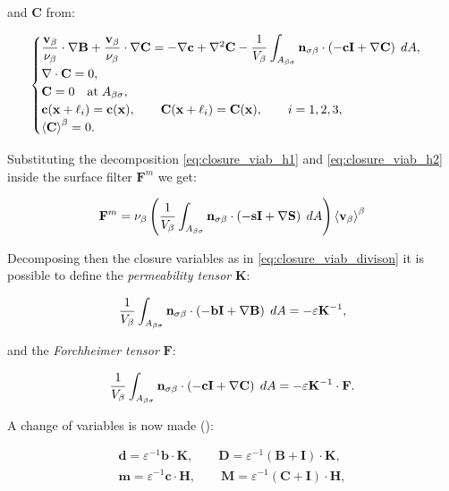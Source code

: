 \newpage
and $\mathbf{C}$ from:

\begin{eqnarray}
	\begin{cases}
		\dfrac{\textbf{v}_{\beta}}{\nu_{\beta}} \cdot  \nabla \mathbf{B} +\dfrac{\textbf{v}_{\beta}}{\nu_{\beta}} \cdot  \nabla \mathbf{C} = -\nabla \mathbf{c} +  \nabla^2 \mathbf{C} - \dfrac{1}{V_\beta} \displaystyle \int_{A_{\beta \sigma}}  \mathbf{n}_{\sigma \beta}  \cdot \left(-\mathbf{c}\mathbf{I}  +  \nabla \mathbf{C} \right)  \;dA,  \\
		\nabla \cdot \mathbf{C} = 0, \\
		\mathbf{C} = 0 \quad \textrm{at} \; A_{\beta \sigma}, \\
		\mathbf{c}(\mathbf{x} +\ell_i) = \mathbf{c}(\mathbf{x}), \qquad \mathbf{C}(\mathbf{x} +\ell_i) = \mathbf{C}(\mathbf{x}), \qquad i=1,2,3 ,\\
		{\left< \mathbf{C} \right>}^{\beta} = 0.
	\end{cases}
\label{eq:C_problem}
\end{eqnarray}

\noindent Substituting the decomposition \eqref{eq:closure_viab_h1} and \eqref{eq:closure_viab_h2} inside the surface filter $\mathbf{F}^m$ we get:

$$
\mathbf{F}^m = \nu_{\beta} \left(\dfrac{1}{V_\beta} \int_{A_{\beta \sigma}} \mathbf{n}_{\sigma \beta}  \cdot \left(-\mathbf{s}\mathbf{I}  +  \nabla \mathbf{S} \right) \;dA \right) {\left< \textbf{v}_{\beta} \right>}^{\beta}
$$

\noindent Decomposing then the closure variables as in \eqref{eq:closure_viab_divison} it is possible to define the \textit{permeability tensor} $\mathbf{K}$:

$$
 \dfrac{1}{V_\beta} \int_{A_{\beta \sigma}} \mathbf{n}_{\sigma \beta}  \cdot \left(-\mathbf{b}\mathbf{I}  +  \nabla \mathbf{B} \right) \;dA = -\varepsilon \mathbf{K}^{-1},
$$

\noindent and the \textit{Forchheimer tensor} $\mathbf{F}$:

$$
\dfrac{1}{V_\beta} \int_{A_{\beta \sigma}} \mathbf{n}_{\sigma \beta}  \cdot \left(-\mathbf{c}\mathbf{I}  +  \nabla \mathbf{C} \right)  \;dA = -\varepsilon \mathbf{K}^{-1} \cdot \mathbf{F}.
$$

\noindent A change of variables is now made (\citet{barrere1992closure}):


\begin{eqnarray}
	\mathbf{d} = \varepsilon^{-1} \mathbf{b} \cdot \mathbf{K}, \qquad \mathbf{D} = \varepsilon^{-1} \left(\mathbf{B} + \mathbf{I} \right)\cdot \mathbf{K}, \\
\mathbf{m} = \varepsilon^{-1} \mathbf{c} \cdot \mathbf{H}, \qquad \mathbf{M} = \varepsilon^{-1} \left(\mathbf{C} + \mathbf{I} \right)\cdot \mathbf{H}, \label{eq:barrere2}
\end{eqnarray}


